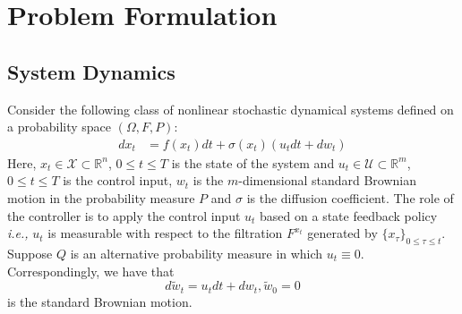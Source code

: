 \documentclass[letterpaper]{article} %
\newcommand{\ie}{\textit{i.e., }}
\begin{document}
\section{Problem Formulation}
\label{sec:problem_formulation}

\subsection{System Dynamics}
Consider the following class of nonlinear stochastic dynamical systems defined on a probability space $(\Omega,F,P)$:
\begin{equation}
\label{eq:continuous_dynamics}
\begin{aligned}
d x_t & =f\left(x_t\right) d t+\sigma\left(x_t\right) \left(u_t dt + dw_t\right)
\end{aligned}
\end{equation}
Here, $x_t \in \mathcal{X} \subset \mathbb{R}^n$, $0 \leq t \leq T$ is the state of the system and $u_t \in \mathcal{U} \subset \mathbb{R}^m$, $0 \leq t \leq T$ is the control input, $w_t$ is the $m$-dimensional standard Brownian motion in the probability measure $P$ and $\sigma$ is the diffusion coefficient.
The role of the controller is to apply the control input $u_t$ based on a state feedback policy \ie $u_t$ is measurable with respect to the filtration $F^{x_t}$ generated by $\{x_\tau\}_{0\leq \tau\leq t}$. Suppose $Q$ is an alternative probability measure in which $u_t \equiv 0$. Correspondingly, we have that
\begin{equation}
    d\tilde{w}_t=u_tdt+dw_t, \tilde{w}_0=0
\end{equation}
is the standard Brownian motion.
\end{document}
